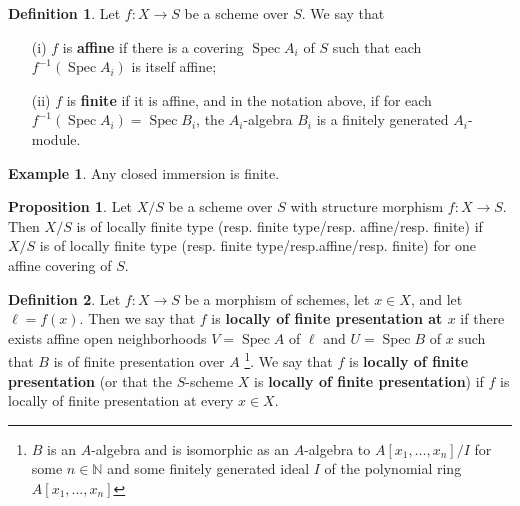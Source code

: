 \documentclass[oneside]{amsart}
\theoremstyle{definition}
\newtheorem{defi}{Definition}[section]
\newtheorem{prop}{Proposition}[section]
\DeclareMathOperator{\spec}{Spec}
\newtheorem{ex}{Example}[section]
\newcommand{\nn}{\mathbb N}
\begin{document}
\begin{defi}
 Let $f \colon X \to S$ be a scheme over $S$. We say that    
 \begin{itemize}
 	\item[(i)] $f$ is \textbf{affine} if there is a covering $\spec A_i$ of $S$ such that each $f ^{-1} (\spec A_i)$ is itself affine;   
 	\item[(ii)] $f$ is \textbf{finite} if it is affine, and in the notation above, if for each $f ^{-1} (\spec A_i) = \spec B_i$, the $A_i$-algebra $B_i$ is a finitely generated $A_i$-module. 
\end{itemize}
\end{defi}
\begin{ex} Any closed immersion is finite. 
\end{ex}

\begin{prop}
 Let $X/S$ be a scheme over $S$ with structure morphism $f \colon X \to S$. Then $X/S$ is of locally finite type (resp. finite type/resp. affine/resp. finite) if $X/S$ is of locally finite type (resp. finite type/resp.affine/resp. finite) for one affine covering of $S$.
 \end{prop} 

\begin{defi} Let $f \colon X \to S$ be a morphism of schemes, let $x \in X$, and let $\ell  = f(x)$. Then we say that $f$ is \textbf{locally of finite presentation at $x$} if there exists affine open neighborhoods $V = \spec A$ of $\ell $ and $U = \spec B$ of $x$ such that $B$ is of finite presentation over $A$ \footnote{$B$ is an $A$-algebra and is isomorphic as an $A$-algebra to $A[x_1, \ldots, x_n] / I$ for some $n \in \nn$ and some finitely generated ideal $I$ of the polynomial ring $A[x_1, \ldots, x_n]$}. We say that $f$ is \textbf{locally of finite presentation} (or that the $S$-scheme $X$ is \textbf{locally of finite presentation}) if $f$ is locally of finite presentation at every $x \in X$.
\end{defi}	
\end{document}
